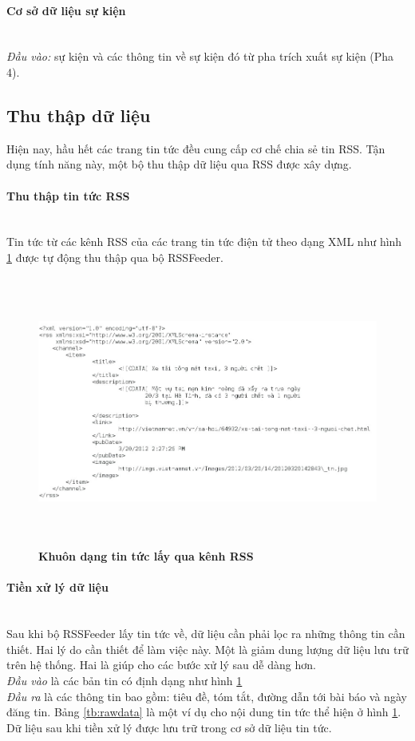 \paragraph{Cơ sở dữ liệu sự kiện} $\;$ \\
\emph{Đầu vào:} sự kiện và các thông tin về sự kiện đó từ pha trích xuất sự kiện (Pha 4).


\subsection{Thu thập dữ liệu}
\label{datacrawler}
\noindent Hiện nay, hầu hết các trang tin tức đều cung cấp cơ chế chia sẻ tin RSS. Tận dụng tính năng này, một bộ thu thập dữ liệu qua RSS được xây dựng.

\paragraph{Thu thập tin tức RSS} $\;$\\
\noindent Tin tức từ các kênh RSS của các trang tin tức điện tử theo dạng XML như hình \ref{fig:xml} được tự động thu thập qua bộ RSSFeeder.

\begin{figure}[htbp]
		\centering
		\includegraphics[width=1\textwidth, height=3.5in]{xmlformat}
		\caption{\textbf{Khuôn dạng tin tức lấy qua kênh RSS}}
		\label{fig:xml}
\end{figure}


\paragraph{Tiền xử lý dữ liệu} $\;$ \\
\noindent Sau khi bộ RSSFeeder lấy tin tức về, dữ liệu cần phải lọc ra những thông tin cần thiết. Hai lý do cần thiết để làm việc này. Một là giảm dung lượng dữ liệu lưu trữ trên hệ thống. Hai là giúp cho các bước xử lý sau dễ dàng hơn. \\
\noindent \emph{Đầu vào} là các bản tin có định dạng như hình \ref{fig:xml} \\
\noindent \emph{Đầu ra} là các thông tin bao gồm: tiêu đề, tóm tắt, đường dẫn tới bài báo và ngày đăng tin. Bảng \ref{tb:rawdata} là một ví dụ cho nội dung tin tức thể hiện ở hình \ref{fig:xml}. Dữ liệu sau khi tiền xử lý được lưu trữ trong  cơ sở dữ liệu tin tức. \\

